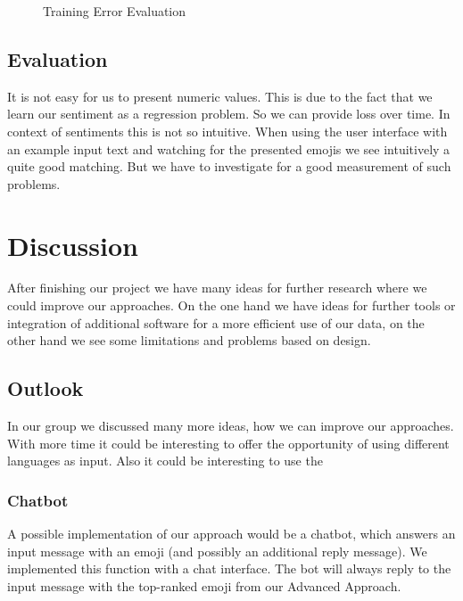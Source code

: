 \documentclass{article}
\begin{document}
\begin{figure}[h!]
\begin{subfigure}[c]{\textwidth}
\end{subfigure}
\caption{Training Error Evaluation}
\label{fig:error_plot}
\end{figure}





\subsection{Evaluation}
It is not easy for us to present numeric values. This is due to the fact that we learn our sentiment as a regression problem. So we can provide loss over time. In context of sentiments this is not so intuitive. When using the user interface with an example input text and watching for the presented emojis we see intuitively a quite good matching. But we have to investigate for a good measurement of such problems.

\section{Discussion}
After finishing our project we have many ideas for further research where we could improve our approaches. On the one hand we have ideas for further tools or integration of additional software for a more efficient use of our data, on the other hand we see some limitations and problems based on design.

\subsection{Outlook}
In our group we discussed many more ideas, how we can improve our approaches. 
With  more time it could be interesting to offer the opportunity of using different languages as input. Also it could be interesting to use the 

\subsubsection{Chatbot}
A possible implementation of our approach would be a chatbot, which answers an input message with an emoji (and possibly an additional reply message). We implemented this function with a chat interface. The bot will always reply to the input message with the top-ranked emoji from our Advanced Approach.
\end{document}
